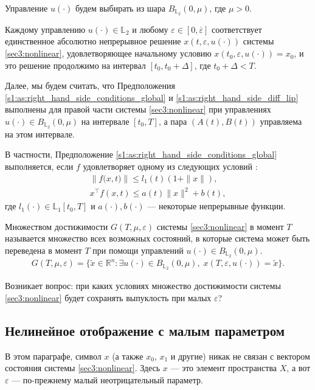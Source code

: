 \documentclass[../main.tex]{subfiles}
\begin{document}
Управление $ u(\cdot) $ будем выбирать из шара $ B_{\mathbb{L}_2}(0,\mu) $, где $ \mu > 0$.

Каждому управлению $u(\cdot) \in \mathbb{L}_2$ и любому $\varepsilon \in [0,\overline{\varepsilon}]$ соответствует единственное абсолютно непрерывное решение $ x(t,\varepsilon, u(\cdot)) $ системы \eqref{sec3:nonlinear}, удовлетворяющее начальному условию $ x(t_0,\varepsilon, u(\cdot)) = x_0$, и это решение продолжимо на интервал $[t_0, t_0 + \Delta]$, где $t_0 + \Delta < T$. 

Далее, мы будем считать, что Предположения \ref{s1:as:right_hand_side_conditions_global} и \ref{s1:as:right_hand_side_diff_lip} выполнены для правой части системы \eqref{sec3:nonlinear} при управлениях $ u(\cdot) \in B_{\mathbb{L}_2}(0,\mu) $ на интервале $ [t_0, T]$, а пара $(A(t), B(t))$ управляема на этом интервале.

В частности, Предположение \ref{s1:as:right_hand_side_conditions_global} выполняется, если $f$ удовлетворяет одному из следующих условий \cite{Filippov2}:
\begin{gather}\label{sec3:sublinear_growth}
 \left\|f\big(x,t\big) \right\| \leqslant l_1(t) (1 + \|x\|), \\ 
 x^{\top} f(x,t) \leqslant a(t) \|x\|^2 + b(t),
\end{gather}
где $l_1(\cdot) \in \mathbb{L}_1[t_0,T]$ и $a(\cdot), b(\cdot)$ --- некоторые непрерывные функции.

\begin{definition} 
 Множеством достижимости $G(T,\mu,\varepsilon) $ системы \eqref{sec3:nonlinear} в момент $T$ называется множество всех возможных состояний, в которые система может быть переведена в момент $T$ при помощи управлений $ u(\cdot) \in B_{\mathbb{L}_2}(0,\mu) $.
 \begin{gather*}
 G(T,\mu,\varepsilon) =\{\widetilde{x}\in \mathbb{R}^n:\exists u(\cdot)\in B_{\mathbb{L}_2}(0,\mu),\; x(T,\varepsilon,u(\cdot)) = \widetilde{x}\}.
 \end{gather*}
\end{definition} 
Возникает вопрос: при каких условиях множество достижимости системы \eqref{sec3:nonlinear} будет сохранять выпуклость при малых $\varepsilon$?

\subsection{Нелинейное отображение с малым параметром}

В этом параграфе, символ $x$ (а также $x_0$, $x_1$ и другие) никак не связан с вектором состояния системы \eqref{sec3:nonlinear}.
Здесь $x$ --- это элемент пространства $X$, а вот $\varepsilon$ --- по-прежнему малый неотрицательный параметр.
\end{document}
